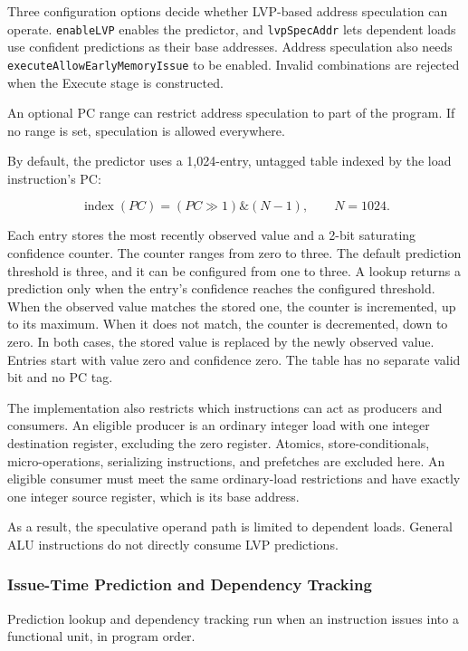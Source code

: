 Three configuration options decide whether LVP-based address
speculation can operate. \texttt{enableLVP} enables the predictor,
and \texttt{lvpSpecAddr} lets dependent loads use confident
predictions as their base addresses. Address speculation also needs
\texttt{executeAllowEarlyMemoryIssue} to be enabled. Invalid
combinations are rejected when the Execute stage is constructed.

An optional PC range can restrict address speculation to part of the
program. If no range is set, speculation is allowed everywhere.

By default, the predictor uses a 1,024-entry, untagged table
indexed by the load instruction's PC:

\[
    \operatorname{index}(PC)
    = (PC \gg 1) \mathbin{\&} (N-1),
    \qquad N=1024.
\]

Each entry stores the most recently observed value and a 2-bit
saturating confidence counter. The counter ranges from zero to
three. The default prediction threshold is three, and it can be
configured from one to three. A lookup returns a prediction only
when the entry's confidence reaches the configured threshold. When
the observed value matches the stored one, the counter is
incremented, up to its maximum. When it does not match, the counter
is decremented, down to zero. In both cases, the stored value is
replaced by the newly observed value. Entries start with value zero
and confidence zero. The table has no separate valid bit and no PC
tag.

The implementation also restricts which instructions can act as
producers and consumers. An eligible producer is an ordinary integer
load with one integer destination register, excluding the zero
register. Atomics, store-conditionals, micro-operations, serializing
instructions, and prefetches are excluded here. An eligible consumer must
meet the same ordinary-load restrictions and have exactly one
integer source register, which is its base address.

As a result, the speculative operand path is limited to dependent
loads. General ALU instructions do not directly consume LVP
predictions.


\subsubsection{Issue-Time Prediction and Dependency Tracking}

Prediction lookup and dependency tracking run when an instruction
issues into a functional unit, in program order.

